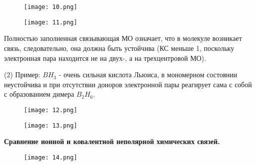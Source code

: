 \par\smallskip

\begin{figure}[H]
	\centering
	{\texttt{[image: 10.png]}}
\end{figure}

\par\smallskip

\par\smallskip

\begin{figure}[H]
	\centering
	{\texttt{[image: 11.png]}}
\end{figure}

\par\smallskip

Полностью заполненная связывающая МО означает, что в молекуле
возникает связь, следовательно, она должна быть устойчива (КС
меньше 1, поскольку электронная пара находится не на двух-, а на
трехцентровой МО).

\par\smallskip

(2) Пример: $BH_3$ - очень сильная кислота Льюиса, в мономерном
состоянии неустойчива и при отсутствии доноров электронной
пары реагирует сама с собой с образованием димера $B_2H_6$.
	
\par\smallskip

\begin{figure}[H]
	\centering
	{\texttt{[image: 12.png]}}
\end{figure}


\begin{figure}[H]
	\centering
	{\texttt{[image: 13.png]}}
\end{figure}

\par\smallskip
	
	\begin{center}
	\textbf{Сравнение ионной и ковалентной неполярной химических связей.}
	\end{center}
	
		\begin{figure}[H]
		\centering
		{\texttt{[image: 14.png]}}
	\end{figure}

\par\bigskip
\par\bigskip
